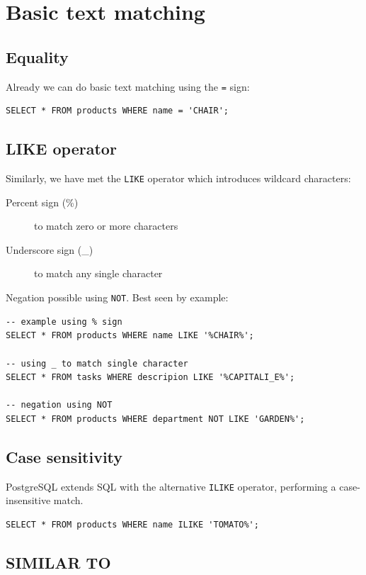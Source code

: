 \documentclass[slides]{pgnotes}
\begin{document}
\section{Basic text matching}

\subsection{Equality}

Already we can do basic text matching using the \texttt{=} sign:
\begin{verbatim}
SELECT * FROM products WHERE name = 'CHAIR';
\end{verbatim}

\subsection{LIKE operator}

Similarly, we have met the \texttt{LIKE} operator which introduces wildcard characters:
\begin{description}
\item[Percent sign (\%)] to match zero or more characters
\item[Underscore sign (\_)] to match any single character
\end{description}
Negation possible using \texttt{NOT}. 
Best seen by example:

\begin{verbatim}
-- example using % sign
SELECT * FROM products WHERE name LIKE '%CHAIR%';

-- using _ to match single character
SELECT * FROM tasks WHERE descripion LIKE '%CAPITALI_E%';

-- negation using NOT
SELECT * FROM products WHERE department NOT LIKE 'GARDEN%';
\end{verbatim}

\subsection{Case sensitivity}

PostgreSQL extends SQL with the alternative \texttt{ILIKE} operator, performing a case-insensitive match.

\begin{verbatim}
SELECT * FROM products WHERE name ILIKE 'TOMATO%';
\end{verbatim}

\subsection{SIMILAR TO}
\end{document}
